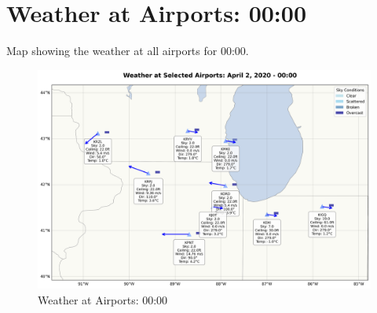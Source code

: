 \section{Weather at Airports: 00:00}
Map showing the weather at all airports for 00:00.
\begin{figure}[htbp]
\centering
\includegraphics[width=0.7	extwidth]{weather_map_00_00.png}
\caption{Weather at Airports: 00:00}
\label{fig:weather_map_00_00}
\end{figure}
